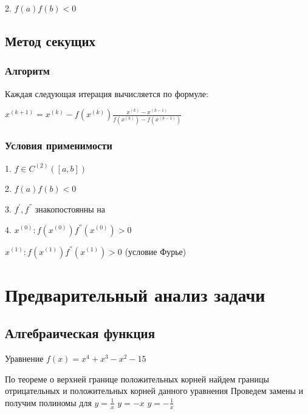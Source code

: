 2. \begin{math}
f(a)f(b)<0
\end{math}
\subsection {Метод секущих}
\subsubsection {Алгоритм}
Каждая следующая итерация вычисляется по формуле:

\begin{math}
x^{(k+1)}=x^{(k)}-f(x^{(k)})\frac{x^{(k)}-x^{(k-1)}}{f(x^{(k)})-f(x^{(k-1)})}
\end{math}
\subsubsection {Условия применимости}
1. \begin{math}
f\in C^{(2)}([a,b])
\end{math}

2. \begin{math}
f(a)f(b)<0
\end{math}

3. \begin{math}
f^{'},f^{''} \end{math} знакопостоянны на \begin{math}[a,b]
\end {math}

4. \begin{math}
x^{(0)}:f(x^{(0)})f^{''}(x^{(0)})>0
\end{math}

   \begin{math}
	x^{(1)}:f(x^{(1)})f^{''}(x^{(1)})>0
\end{math}
(условие Фурье)

\section{Предварительный анализ задачи}
\subsection{Алгебраическая функция}
Уравнение \begin{math} 
	f(x)=x^{4}+x^{3}-x^{2}-15
	\end {math}

По теореме о верхней границе положительных корней найдем границы отрицательных и положительных корней данного уравнения
Проведем замены и получим полиномы для 
\begin{math} 
	y=\frac1{x}
\end{math}
\begin{math} 
	y=-x
\end{math}
\begin{math} 
	y=-\frac1{x}
\end{math}


